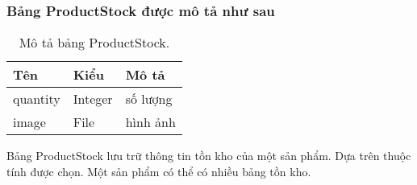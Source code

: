 \subsubsection{Bảng ProductStock được mô tả như sau}
\begin{table}[!htbp]\fontsize{13px}{13px}\selectfont\justifying
\begin{center}
\caption{Mô tả bảng ProductStock.}
\begin{tabularx}{0.6\textwidth}{ |l|l|X| } 
\hline
Tên & Kiểu & Mô tả \\
\hline
quantity & Integer & số lượng \\
image & File & hình ảnh \\ 
\hline
\end{tabularx}
\label{table:ProductStock}
\end{center}
Bảng ProductStock lưu trữ thông tin tồn kho của một sản phẩm. Dựa trên thuộc tính được chọn. Một sản phẩm có thể có nhiều bảng tồn kho.
\end{table}

